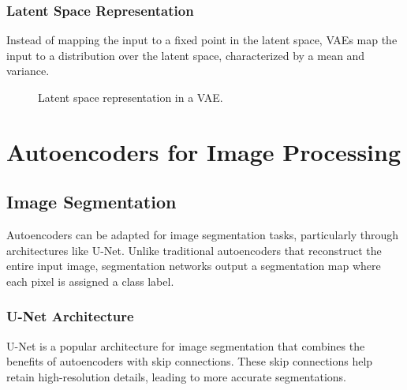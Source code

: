 \documentclass{article}
\begin{document}
\subsubsection{Latent Space Representation}

Instead of mapping the input to a fixed point in the latent space, VAEs map the input to a distribution over the latent space, characterized by a mean and variance.

\begin{figure}[h]
    \centering
    \caption{Latent space representation in a VAE.}
    \label{fig:vae}
\end{figure}

\section{Autoencoders for Image Processing}

\subsection{Image Segmentation}

Autoencoders can be adapted for image segmentation tasks, particularly through architectures like U-Net. Unlike traditional autoencoders that reconstruct the entire input image, segmentation networks output a segmentation map where each pixel is assigned a class label.

\subsubsection{U-Net Architecture}

U-Net is a popular architecture for image segmentation that combines the benefits of autoencoders with skip connections. These skip connections help retain high-resolution details, leading to more accurate segmentations.
\end{document}
